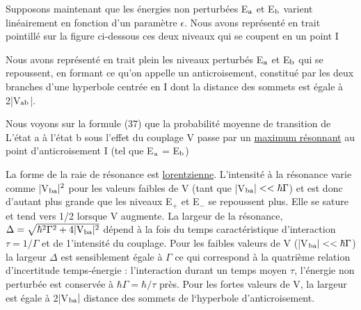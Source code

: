 Supposons maintenant que les énergies non perturbées E$_{\text{a}}$ et E$_{\text{b}}$ varient linéairement
en fonction d'un paramètre $\epsilon$. Nous avons représenté en
trait pointillé sur la figure ci-dessous ces deux niveaux qui se coupent en
un point I
\begin{center} 
\end{center}

Nous avons représenté en trait plein les niveaux perturbés E$_{\text{a}}$ et E$_{\text{b}}$ qui
se repoussent, en formant ce qu'on appelle un anticroisement, constitué par les
deux branches d'une hyperbole centrée en I dont la distance des sommets est égale à 2|V$_{\text{ab}}$|.


Nous voyons sur la formule (37) que la probabilité moyenne de transition de L'état a à l'état b sous l'effet
du couplage V passe par un \ul{maximum résonnant} au point d'anticroisement I (tel que E$_{\text{a}}$ = E$_{\text{b}}$)

La forme de la raie de résonance est \ul{lorentzienne}. L'intensité à la
résonance varie comme |V$_{\text{ba}}|^2$ pour les valeurs faibles de V (tant que |V$_{\text{ba}}|<<\hbar\Gamma$)
et est donc d'autant plus grande que les niveaux E$_+$ et E$_-$ se
repoussent plus. Elle se sature et tend vers 1/2
lorsque V augmente.
La largeur de la résonance, $\Delta=\sqrt{\hbar^2\Gamma^2+4|\text{V}_{\text{ba}}|^2}$ dépend à la fois du temps
caractéristique d'interaction $\tau=1/\Gamma$ et de 1'intensité du couplage. Pour les
faibles valeurs de V (|V$_{\text{ba}}|<<\hbar\Gamma$) la largeur $\Delta$ est sensiblement égale à $\Gamma$
ce qui correspond à la quatrième relation d'incertitude temps-énergie : l'interaction
durant un temps moyen $\tau$, l'énergie non perturbée est conservée à
$\hbar\Gamma=\hbar/\tau$ près. Pour les fortes valeurs de V, la largeur est égale à 2|V$_{\text{ba}}|$
distance des sommets de l‘hyperbole d'anticroisement.

